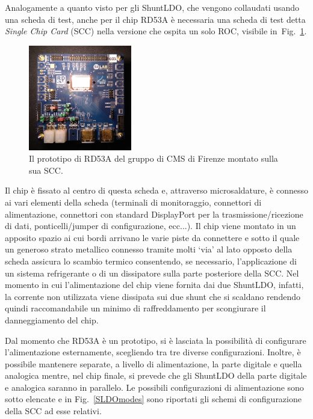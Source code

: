 Analogamente a quanto visto per gli ShuntLDO, che vengono collaudati usando una scheda di test, anche per il chip RD53A è necessaria una scheda di test detta \textit{Single Chip Card} (SCC) nella versione che ospita un solo ROC, visibile in~Fig.~\ref{fig:RD53onSCC}.
\begin{figure}[t]
\centering
\includegraphics[width=0.4\textwidth]{Immagini/RD53onSCC.jpg}
\caption{Il prototipo di RD53A del gruppo di CMS di Firenze montato sulla sua SCC.}
\label{fig:RD53onSCC}
\end{figure}
 Il chip è fissato al centro di questa scheda e, attraverso microsaldature, è connesso ai vari elementi della scheda (terminali di monitoraggio, connettori di alimentazione, connettori con standard DisplayPort per la trasmissione/ricezione di dati, ponticelli/jumper di configurazione, ecc...). 
Il chip viene montato in un apposito spazio ai cui bordi arrivano le varie piste da connettere e sotto il quale un generoso strato metallico connesso tramite molti `via' al lato opposto della scheda assicura lo scambio termico consentendo, se necessario, l'applicazione di un sistema refrigerante o di un dissipatore sulla parte posteriore della SCC. 
Nel momento in cui l'alimentazione del chip viene fornita dai due ShuntLDO, infatti, la corrente non utilizzata viene dissipata sui due shunt che si scaldano rendendo quindi raccomandabile un minimo di raffreddamento per scongiurare il danneggiamento del chip.

Dal momento che RD53A è un prototipo, si è lasciata la possibilità di configurare l'alimentazione esternamente, scegliendo tra tre diverse configurazioni.
Inoltre, è possibile mantenere separate, a livello di alimentazione, la parte digitale e quella analogica mentre, nel chip finale, si prevede che gli ShuntLDO della parte digitale e analogica saranno in parallelo. Le possibili configurazioni di alimentazione sono sotto elencate e in Fig.~\ref{SLDOmodes} sono riportati gli schemi di configurazione della SCC ad esse relativi.

